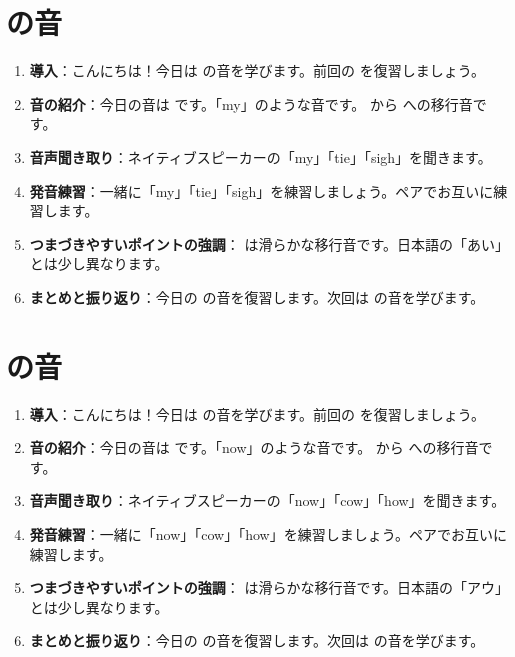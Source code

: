 \documentclass[book,jafontscale=0.9247]{jlreq}
\begin{document}
\section{ の音}
\begin{enumerate}
     \item \textbf{導入}：こんにちは！今日は  の音を学びます。前回の  を復習しましょう。
    \item \textbf{音の紹介}：今日の音は  です。「my」のような音です。  から  への移行音です。
    \item \textbf{音声聞き取り}：ネイティブスピーカーの「my」「tie」「sigh」を聞きます。
    \item \textbf{発音練習}：一緒に「my」「tie」「sigh」を練習しましょう。ペアでお互いに練習します。
    \item \textbf{つまづきやすいポイントの強調}：  は滑らかな移行音です。日本語の「あい」とは少し異なります。
    \item \textbf{まとめと振り返り}：今日の  の音を復習します。次回は  の音を学びます。
\end{enumerate}

\section{ の音}
\begin{enumerate}
    \item \textbf{導入}：こんにちは！今日は  の音を学びます。前回の  を復習しましょう。
    \item \textbf{音の紹介}：今日の音は  です。「now」のような音です。  から  への移行音です。
    \item \textbf{音声聞き取り}：ネイティブスピーカーの「now」「cow」「how」を聞きます。
    \item \textbf{発音練習}：一緒に「now」「cow」「how」を練習しましょう。ペアでお互いに練習します。
    \item \textbf{つまづきやすいポイントの強調}：  は滑らかな移行音です。日本語の「アウ」とは少し異なります。
    \item \textbf{まとめと振り返り}：今日の  の音を復習します。次回は  の音を学びます。
\end{enumerate}
\end{document}
